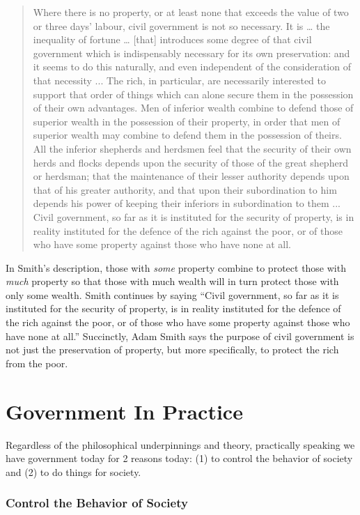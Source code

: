 \begin{quote}
Where there is no property, or at least none that exceeds the value of two or three days' labour, civil government is not so necessary.  It is … the inequality of fortune … [that] introduces some degree of that civil government which is indispensably necessary for its own preservation: and it seems to do this naturally, and even independent of the consideration of that necessity ... 
The rich, in particular, are necessarily interested to support that order of things which can alone secure them in the possession of their own advantages.  Men of inferior wealth combine to defend those of superior wealth in the possession of their property, in order that men of superior wealth may combine to defend them in the possession of theirs.  All the inferior shepherds and herdsmen feel that the security of their own herds and flocks depends upon the security of those of the great shepherd or herdsman; that the maintenance of their lesser authority depends upon that of his greater authority, and that upon their subordination to him depends his power of keeping their inferiors in subordination to them ... Civil government, so far as it is instituted for the security of property, is in reality instituted for the defence of the rich against the poor, or of those who have some property against those who have none at all.
\end{quote}

In Smith's description, those with \textit{some} property combine to protect those with \textit{much} property so that those with much wealth will in turn protect those with only some wealth.  Smith continues by saying ``Civil government, so far as it is instituted for the security of property, is in reality instituted for the defence of the rich against the poor, or of those who have some property against those who have none at all.''  Succinctly, Adam Smith says the purpose of civil government is not just the preservation of property, but more specifically, to protect the rich from the poor.

\section{Government In Practice}

Regardless of the philosophical underpinnings and theory, practically speaking we have government today for 2 reasons today: (1) to control the behavior of society and (2) to do things for society.

\subsubsection{Control the Behavior of Society}

